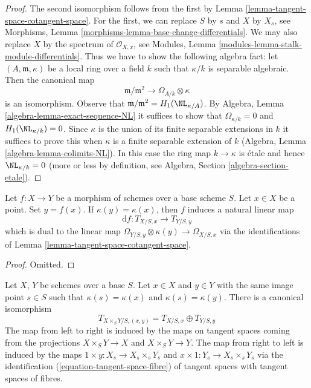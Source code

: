 \begin{proof}
The second isomorphism follows from the first by
Lemma \ref{lemma-tangent-space-cotangent-space}.
For the first, we can replace $S$ by $s$ and $X$ by $X_s$, see
Morphisms, Lemma \ref{morphisms-lemma-base-change-differentials}.
We may also replace $X$ by the spectrum of $\mathcal{O}_{X, x}$, see
Modules, Lemma \ref{modules-lemma-stalk-module-differentials}.
Thus we have to show the following algebra fact: let
$(A, \mathfrak m, \kappa)$ be a local ring over a field $k$
such that $\kappa/k$ is separable algebraic. Then the canonical map
$$
\mathfrak m/\mathfrak m^2
\longrightarrow
\Omega_{A/k} \otimes \kappa
$$
is an isomorphism. Observe that
$\mathfrak m/\mathfrak m^2 = H_1(\NL_{\kappa/A})$. By
Algebra, Lemma \ref{algebra-lemma-exact-sequence-NL}
it suffices to show that $\Omega_{\kappa/k} = 0$ and
$H_1(\NL_{\kappa/k}) = 0$. Since $\kappa$ is the union of
its finite separable extensions in $k$ it suffices to prove
this when $\kappa$ is a finite separable extension of $k$
(Algebra, Lemma \ref{algebra-lemma-colimits-NL}).
In this case the ring map $k \to \kappa$ is \'etale
and hence $\NL_{\kappa/k} = 0$ (more or less by definition, see
Algebra, Section \ref{algebra-section-etale}).
\end{proof}

\begin{lemma}
\label{lemma-map-tangent-spaces}
Let $f : X \to Y$ be a morphism of schemes over a base scheme $S$.
Let $x \in X$ be a point. Set $y = f(x)$. If $\kappa(y) = \kappa(x)$,
then $f$ induces a natural linear map
$$
\text{d}f : T_{X/S, x} \longrightarrow T_{Y/S, y}
$$
which is dual to the linear map
$\Omega_{Y/S, y} \otimes \kappa(y) \to \Omega_{X/S, x}$
via the identifications of Lemma \ref{lemma-tangent-space-cotangent-space}.
\end{lemma}

\begin{proof}
Omitted.
\end{proof}

\begin{lemma}
\label{lemma-tangent-space-product}
Let $X$, $Y$ be schemes over a base $S$. Let $x \in X$ and $y \in Y$ with
the same image point $s \in S$ such that $\kappa(s) = \kappa(x)$ and
$\kappa(s) = \kappa(y)$. There is a canonical isomorphism
$$
T_{X \times_S Y/S, (x, y)} = T_{X/S, x} \oplus T_{Y/S, y}
$$
The map from left to right is induced by the maps on tangent spaces coming
from the projections $X \times_S Y \to X$ and $X \times_S Y \to Y$.
The map from right to left is induced by the maps
$1 \times y : X_s \to X_s \times_s Y_s$ and
$x \times 1 : Y_s \to X_s \times_s Y_s$ via the identification
(\ref{equation-tangent-space-fibre}) of
tangent spaces with tangent spaces of fibres.
\end{lemma}

